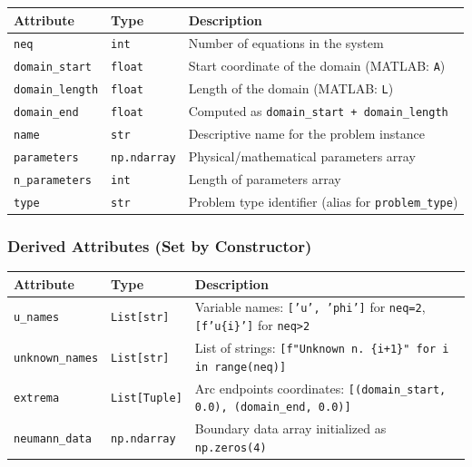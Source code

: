\begin{longtable}{|p{3.5cm}|p{2.5cm}|p{7cm}|}
\hline
\textbf{Attribute} & \textbf{Type} & \textbf{Description} \\
\hline
\endhead

\texttt{neq} & \texttt{int} & Number of equations in the system \\
\hline

\texttt{domain\_start} & \texttt{float} & Start coordinate of the domain (MATLAB: \texttt{A}) \\
\hline

\texttt{domain\_length} & \texttt{float} & Length of the domain (MATLAB: \texttt{L}) \\
\hline

\texttt{domain\_end} & \texttt{float} & Computed as \texttt{domain\_start + domain\_length} \\
\hline

\texttt{name} & \texttt{str} & Descriptive name for the problem instance \\
\hline

\texttt{parameters} & \texttt{np.ndarray} & Physical/mathematical parameters array \\
\hline

\texttt{n\_parameters} & \texttt{int} & Length of parameters array \\
\hline

\texttt{type} & \texttt{str} & Problem type identifier (alias for \texttt{problem\_type}) \\
\hline

\end{longtable}

\subsubsection{Derived Attributes (Set by Constructor)}

\begin{longtable}{|p{3.5cm}|p{2.5cm}|p{7cm}|}
\hline
\textbf{Attribute} & \textbf{Type} & \textbf{Description} \\
\hline
\endhead

\texttt{u\_names} & \texttt{List[str]} & Variable names: \texttt{['u', 'phi']} for \texttt{neq=2}, \texttt{[f'u\{i\}']} for \texttt{neq>2} \\
\hline

\texttt{unknown\_names} & \texttt{List[str]} & List of strings: \texttt{[f"Unknown n. \{i+1\}" for i in range(neq)]} \\
\hline

\texttt{extrema} & \texttt{List[Tuple]} & Arc endpoints coordinates: \texttt{[(domain\_start, 0.0), (domain\_end, 0.0)]} \\
\hline

\texttt{neumann\_data} & \texttt{np.ndarray} & Boundary data array initialized as {\color{red} \texttt{np.zeros(4)} }\\
\hline

\end{longtable}

